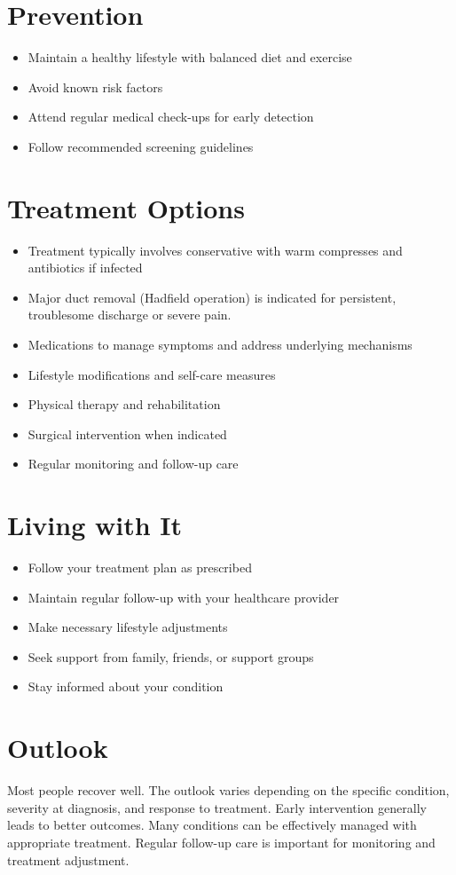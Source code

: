 \section{Prevention}
\begin{itemize}[noitemsep]
  \item Maintain a healthy lifestyle with balanced diet and exercise
  \item Avoid known risk factors
  \item Attend regular medical check-ups for early detection
  \item Follow recommended screening guidelines
\end{itemize}
\section{Treatment Options}
\begin{itemize}[noitemsep]
  \item Treatment typically involves conservative with warm compresses and antibiotics if infected
  \item Major duct removal (Hadfield operation) is indicated for persistent, troublesome discharge or severe pain.
  \item Medications to manage symptoms and address underlying mechanisms
  \item Lifestyle modifications and self-care measures
  \item Physical therapy and rehabilitation
  \item Surgical intervention when indicated
  \item Regular monitoring and follow-up care
\end{itemize}
\section{Living with It}
\begin{itemize}[noitemsep]
  \item Follow your treatment plan as prescribed
  \item Maintain regular follow-up with your healthcare provider
  \item Make necessary lifestyle adjustments
  \item Seek support from family, friends, or support groups
  \item Stay informed about your condition
\end{itemize}
\section{Outlook}
Most people recover well. The outlook varies depending on the specific condition, severity at diagnosis, and response to treatment. Early intervention generally leads to better outcomes. Many conditions can be effectively managed with appropriate treatment. Regular follow-up care is important for monitoring and treatment adjustment.
